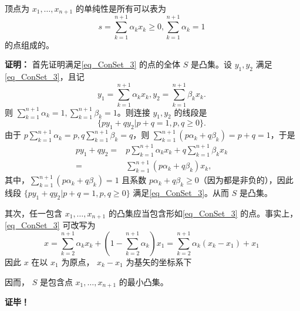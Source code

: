 \begin{theorem}{}
顶点为  $x_1,\ldots,x_{n+1}$ 的单纯性是所有可以表为
\begin{equation}\label{eq_ConSet_3}
s=\sum_{k=1}^{n+1} \alpha_k x_k\geq0,\sum_{k=1}^{n+1}\alpha_k=1~
\end{equation}
的点组成的。
\end{theorem}

\textbf{证明：}
首先证明满足\autoref{eq_ConSet_3} 的点的全体 $S$ 是凸集。设 $y_1,y_2$ 满足\autoref{eq_ConSet_3}，且记
\begin{equation}
y_1=\sum_{k=1}^{n+1} \alpha_k x_k,y_2=\sum_{k=1}^{n+1} \beta_k x_k.~
\end{equation}
则 $\sum_{k=1}^{n+1}\alpha_k=1,\sum_{k=1}^{n+1}\beta_k=1$。则连接 $y_1,y_2$ 的线段是
\begin{equation}
\{py_1+qy_2|p+q=1,p,q\geq0\}.~
\end{equation}
由于 $p\sum_{k=1}^{n+1}\alpha_k=p,q\sum_{k=1}^{n+1}\beta_k=q$，则 $\sum_{k=1}^{n+1}(p\alpha_k +q\beta_k)=p+q=1$，于是
\begin{equation}
\begin{aligned}
py_1+qy_2=&p\sum_{k=1}^{n+1} \alpha_k x_k+q\sum_{k=1}^{n+1} \beta_k x_k\\
=&\sum_{k=1}^{n+1}(p\alpha_k +q\beta_k) x_k,
\end{aligned}~
\end{equation}
其中，$\sum_{k=1}^{n+1}(p\alpha_k +q\beta_k)=1$ 且系数 $p\alpha_k +q\beta_k\geq0$（因为都是非负的），因此线段 $\{py_1+qy_2|p+q=1,p,q\geq0\}$ 满足\autoref{eq_ConSet_3}。从而 $S$ 是凸集。

其次，任一包含 $x_1,\ldots,x_{n+1}$ 的凸集应当包含形如\autoref{eq_ConSet_3} 的点。事实上，\autoref{eq_ConSet_3} 可改写为
\begin{equation}
x=\sum_{k=2}^{n+1}\alpha_kx_k+(1-\sum_{k=2}^{n+1}\alpha_k)x_1=\sum_{k=2}^{n+1}\alpha_k(x_k-x_1)+x_1~
\end{equation}
因此 $x$ 在以 $x_1$ 为原点， $x_k-x_1$ 为基矢的坐标系下

因而， $S$ 是包含点 $x_1,\ldots,x_{n+1}$ 的最小凸集。

\textbf{证毕！}
























